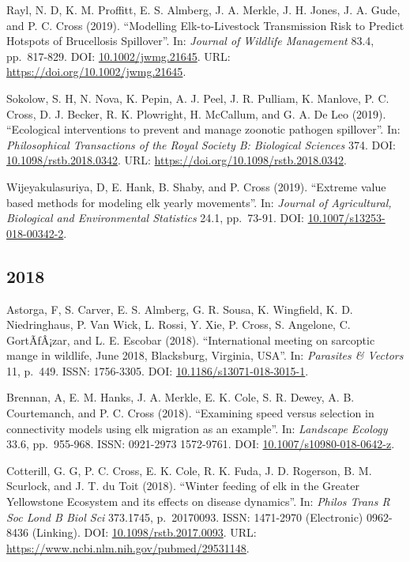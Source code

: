\documentclass[12pt,]{article}
\begin{document}
Rayl, N. D, K. M. Proffitt, E. S. Almberg, J. A. Merkle, J. H. Jones, J.
A. Gude, and P. C. Cross (2019). ``Modelling Elk-to-Livestock
Transmission Risk to Predict Hotspots of Brucellosis Spillover''. In:
\emph{Journal of Wildlife Management} 83.4, pp.~817-829. DOI:
\href{https://doi.org/10.1002\%2Fjwmg.21645}{10.1002/jwmg.21645}. URL:
\url{https://doi.org/10.1002/jwmg.21645}.

Sokolow, S. H, N. Nova, K. Pepin, A. J. Peel, J. R. Pulliam, K. Manlove,
P. C. Cross, D. J. Becker, R. K. Plowright, H. McCallum, and G. A. De
Leo (2019). ``Ecological interventions to prevent and manage zoonotic
pathogen spillover''. In: \emph{Philosophical Transactions of the Royal
Society B: Biological Sciences} 374. DOI:
\href{https://doi.org/10.1098\%2Frstb.2018.0342}{10.1098/rstb.2018.0342}.
URL: \url{https://doi.org/10.1098/rstb.2018.0342}.

Wijeyakulasuriya, D, E. Hank, B. Shaby, and P. Cross (2019). ``Extreme
value based methods for modeling elk yearly movements''. In:
\emph{Journal of Agricultural, Biological and Environmental Statistics}
24.1, pp.~73-91. DOI:
\href{https://doi.org/10.1007\%2Fs13253-018-00342-2}{10.1007/s13253-018-00342-2}.

\hypertarget{section-1}{%
\subsection{2018}\label{section-1}}

Astorga, F, S. Carver, E. S. Almberg, G. R. Sousa, K. Wingfield, K. D.
Niedringhaus, P. Van Wick, L. Rossi, Y. Xie, P. Cross, S. Angelone, C.
GortÃƒÂ¡zar, and L. E. Escobar (2018). ``International meeting on
sarcoptic mange in wildlife, June 2018, Blacksburg, Virginia, USA''. In:
\emph{Parasites \& Vectors} 11, p.~449. ISSN: 1756-3305. DOI:
\href{https://doi.org/10.1186\%2Fs13071-018-3015-1}{10.1186/s13071-018-3015-1}.

Brennan, A, E. M. Hanks, J. A. Merkle, E. K. Cole, S. R. Dewey, A. B.
Courtemanch, and P. C. Cross (2018). ``Examining speed versus selection
in connectivity models using elk migration as an example''. In:
\emph{Landscape Ecology} 33.6, pp.~955-968. ISSN: 0921-2973 1572-9761.
DOI:
\href{https://doi.org/10.1007\%2Fs10980-018-0642-z}{10.1007/s10980-018-0642-z}.

Cotterill, G. G, P. C. Cross, E. K. Cole, R. K. Fuda, J. D. Rogerson, B.
M. Scurlock, and J. T. du Toit (2018). ``Winter feeding of elk in the
Greater Yellowstone Ecosystem and its effects on disease dynamics''. In:
\emph{Philos Trans R Soc Lond B Biol Sci} 373.1745, p.~20170093. ISSN:
1471-2970 (Electronic) 0962-8436 (Linking). DOI:
\href{https://doi.org/10.1098\%2Frstb.2017.0093}{10.1098/rstb.2017.0093}.
URL: \url{https://www.ncbi.nlm.nih.gov/pubmed/29531148}.
\end{document}
